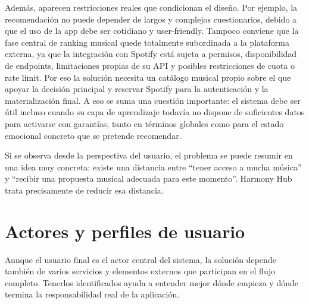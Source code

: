 Además, aparecen restricciones reales que condicionan el diseño. Por ejemplo, la recomendación no puede depender de largos y complejos cuestionarios, debido a que el uso de la app debe ser cotidiano y user-friendly. Tampoco conviene que la fase central de ranking musical quede totalmente subordinada a la plataforma externa, ya que la integración con Spotify está sujeta a permisos, disponibilidad de endpoints, limitaciones propias de su API y posibles restricciones de cuota o rate limit. Por eso la solución necesita un catálogo musical propio sobre el que apoyar la decisión principal y reservar Spotify para la autenticación y la materialización final. A eso se suma una cuestión importante: el sistema debe ser útil incluso cuando su capa de aprendizaje todavía no dispone de suficientes datos para activarse con garantías, tanto en términos globales como para el estado emocional concreto que se pretende recomendar.

Si se observa desde la perspectiva del usuario, el problema se puede resumir en una idea muy concreta: existe una distancia entre ``tener acceso a mucha música'' y ``recibir una propuesta musical adecuada para este momento''. Harmony Hub trata precisamente de reducir esa distancia.

\section{Actores y perfiles de usuario}
\label{sec:actores}

Aunque el usuario final es el actor central del sistema, la solución depende también de varios servicios y elementos externos que participan en el flujo completo. Tenerlos identificados ayuda a entender mejor dónde empieza y dónde termina la responsabilidad real de la aplicación.

